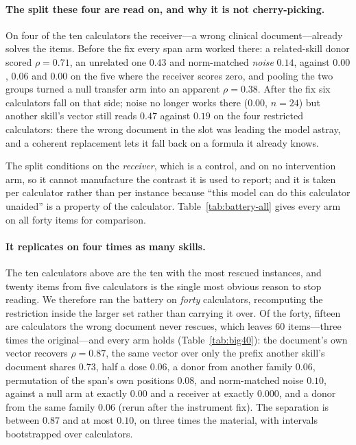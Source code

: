 \documentclass{article}
\begin{document}
\paragraph{The split these four are read on, and why it is not cherry-picking.}
On four of the ten calculators the receiver---a wrong clinical document---already
solves the items. Before the fix every span arm worked there: a related-skill
donor scored $\rho = 0.71$, an unrelated one $0.43$ and norm-matched
\emph{noise} $0.14$, against $0.00$, $0.06$ and $0.00$ on the five where the
receiver scores zero, and pooling the two groups turned a null transfer arm into
an apparent $\rho = 0.38$. After the fix six calculators fall on that side;
noise no longer works there ($0.00$, $n=24$) but another skill's vector still
reads $0.47$ against $0.19$ on the four restricted calculators: there the wrong
document in the slot was leading the model astray, and a coherent replacement
lets it fall back on a formula it already knows.

The split conditions on the \emph{receiver}, which is a control, and on no
intervention arm, so it cannot manufacture the contrast it is used to report; and
it is taken per calculator rather than per instance because ``this model can do
this calculator unaided'' is a property of the calculator. Table~\ref{tab:battery-all}
gives every arm on all forty items for comparison.

\paragraph{It replicates on four times as many skills.} The ten calculators
above are the ten with the most rescued instances, and twenty items from five
calculators is the single most obvious reason to stop reading. We therefore ran
the battery on \emph{forty} calculators, recomputing the restriction inside the
larger set rather than carrying it over. Of the forty, fifteen are calculators
the wrong document never rescues, which leaves $60$ items---three times the
original---and every arm holds (Table~\ref{tab:big40}): the document's own
vector recovers $\rho = 0.87$, the same vector over only the prefix another skill's document shares $0.73$, half a dose
$0.06$, a donor from another family $0.06$, permutation of the span's own
positions $0.08$, and norm-matched noise $0.10$, against a null arm at exactly
$0.00$ and a receiver at exactly $0.000$, and a donor from the same family
$0.06$ (rerun after the instrument fix). The separation is
between $0.87$ and at most $0.10$, on three times the material, with
intervals bootstrapped over calculators.
\end{document}

